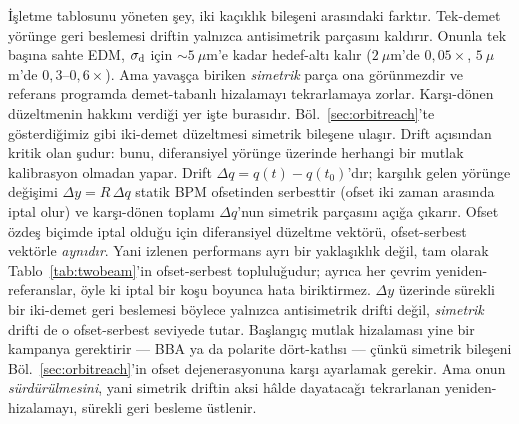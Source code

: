 \documentclass[aps,prab,reprint,superscriptaddress,nofootinbib]{revtex4-2}
\begin{document}
İşletme tablosunu yöneten şey, iki kaçıklık bileşeni arasındaki farktır. Tek-demet
yörünge geri beslemesi driftin yalnızca antisimetrik parçasını kaldırır. Onunla tek
başına sahte EDM, $\sigma_{\rm d}$ için $\sim\!5~\mu$m'e kadar hedef-altı kalır
($2~\mu$m'de $0{,}05\times$, $5~\mu$m'de $0{,}3$--$0{,}6\times$). Ama yavaşça biriken
\emph{simetrik} parça ona görünmezdir ve referans programda demet-tabanlı hizalamayı
tekrarlamaya zorlar. Karşı-dönen düzeltmenin hakkını verdiği yer işte burasıdır.
Böl.~\ref{sec:orbitreach}'te gösterdiğimiz gibi iki-demet düzeltmesi simetrik bileşene
ulaşır. Drift açısından kritik olan şudur: bunu, diferansiyel yörünge üzerinde
herhangi bir mutlak kalibrasyon olmadan yapar. Drift $\Delta q = q(t)-q(t_0)$'dır;
karşılık gelen yörünge değişimi $\Delta y = R\,\Delta q$ statik BPM ofsetinden
serbesttir (ofset iki zaman arasında iptal olur) ve karşı-dönen toplamı $\Delta q$'nun
simetrik parçasını açığa çıkarır. Ofset özdeş biçimde iptal olduğu için diferansiyel
düzeltme vektörü, ofset-serbest vektörle \emph{aynıdır}. Yani izlenen performans ayrı
bir yaklaşıklık değil, tam olarak Tablo~\ref{tab:twobeam}'in ofset-serbest
topluluğudur; ayrıca her çevrim yeniden-referanslar, öyle ki iptal bir koşu boyunca
hata biriktirmez. $\Delta y$ üzerinde sürekli bir iki-demet geri beslemesi böylece
yalnızca antisimetrik drifti değil, \emph{simetrik} drifti de o ofset-serbest seviyede
tutar. Başlangıç mutlak hizalaması yine bir kampanya gerektirir --- BBA ya da
polarite dört-katlısı --- çünkü simetrik bileşeni Böl.~\ref{sec:orbitreach}'in ofset
dejenerasyonuna karşı ayarlamak gerekir. Ama onun \emph{sürdürülmesini}, yani simetrik
driftin aksi hâlde dayatacağı tekrarlanan yeniden-hizalamayı, sürekli geri besleme
üstlenir.
\end{document}
